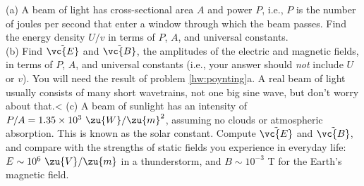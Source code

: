 (a) A beam of light has cross-sectional area $A$ and power $P$, i.e., $P$ is
        the number of joules per second that enter a window through which the beam
        passes. Find the energy density $U/v$ in terms of $P$, $A$, and universal constants.\\
        (b) Find $\tilde{\vc{E}}$ and $\tilde{\vc{B}}$, the amplitudes of the
        electric and magnetic fields, in terms of $P$, $A$, and universal constants (i.e., your answer
        should \emph{not} include $U$ or $v$). You will need the result of problem
        \ref{hw:poynting}a.
        A real beam of light usually consists of
        many short wavetrains, not one big sine wave, but don't
        worry about that.\answercheck<%
        (c) A beam of sunlight has an intensity of $P/A=1.35\times10^3\ \zu{W}/\zu{m}^2$,
        assuming no clouds or atmospheric absorption. This is known as the
        solar constant. Compute  $\tilde{\vc{E}}$ and $\tilde{\vc{B}}$,
        and compare with the strengths of static fields you experience in everyday life:
        $E \sim 10^6\ \zu{V}/\zu{m}$ in a thunderstorm, and $B \sim 10^{-3}$ T for the Earth's
        magnetic field.\answercheck
